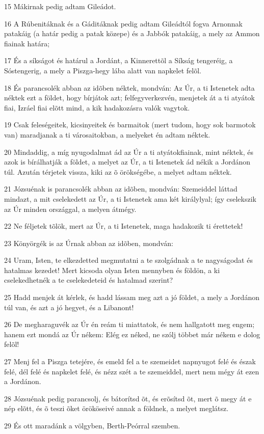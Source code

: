 \par 15 Mákirnak pedig adtam Gileádot.
\par 16 A Rúbenitáknak és a Gáditáknak pedig adtam Gileádtól fogva Arnonnak patakáig (a határ pedig a patak közepe) és a Jabbók patakáig, a mely az Ammon fiainak határa;
\par 17 És a síkságot és határul a Jordánt, a Kinnerettõl a Síkság tengeréig, a Sóstengerig, a mely a Piszga-hegy lába alatt van napkelet felõl.
\par 18 És parancsolék abban az idõben néktek, mondván: Az Úr, a ti Istenetek adta néktek ezt a földet, hogy bírjátok azt; felfegyverkezvén, menjetek át a ti atyátok fiai, Izráel fiai elõtt mind, a kik hadakozásra valók vagytok.
\par 19 Csak feleségeitek, kicsinyeitek és barmaitok (mert tudom, hogy sok barmotok van) maradjanak a ti városaitokban, a melyeket én adtam néktek.
\par 20 Mindaddig, a míg nyugodalmat ád az Úr a ti atyátokfiainak, mint néktek, és azok is bírálhatják a földet, a melyet az Úr, a ti Istenetek ád nékik a Jordánon túl. Azután térjetek vissza, kiki az õ örökségébe, a melyet adtam néktek.
\par 21 Józsuénak is parancsolék abban az idõben, mondván: Szemeiddel láttad mindazt, a mit cselekedett az Úr, a ti Istenetek ama két királylyal; így cselekszik az Úr minden országgal, a melyen átmégy.
\par 22 Ne féljetek tõlök, mert az Úr, a ti Istenetek, maga hadakozik ti érettetek!
\par 23 Könyörgék is az Úrnak abban az idõben, mondván:
\par 24 Uram, Isten, te elkezdetted megmutatni a te szolgádnak a te nagyságodat és hatalmas kezedet! Mert kicsoda olyan Isten mennyben és földön, a ki cselekedhetnék a te cselekedeteid és hatalmad szerint?
\par 25 Hadd menjek át kérlek, és hadd lássam meg azt a jó földet, a mely a Jordánon túl van, és azt a jó hegyet, és a Libanont!
\par 26 De megharaguvék az Úr én reám ti miattatok, és nem hallgatott meg engem; hanem ezt mondá az Úr nékem: Elég ez néked, ne szólj többet már nékem e dolog felõl!
\par 27 Menj fel a Piszga tetejére, és emeld fel a te szemeidet napnyugot felé és észak felé, dél felé és napkelet felé, és nézz szét a te szemeiddel, mert nem mégy át ezen a Jordánon.
\par 28 Józsuénak pedig parancsolj, és bátorítsd õt, és erõsítsd õt, mert õ megy át e nép elõtt, és õ teszi õket örököseivé annak a földnek, a melyet meglátsz.
\par 29 És ott maradánk a völgyben, Berth-Peórral szemben.

